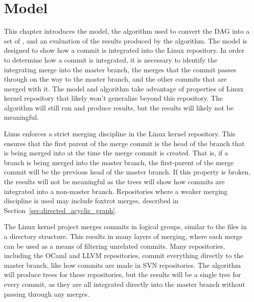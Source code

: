 \chapter{\mt{} Model}\label{chap:model}

This chapter introduces the \mt{} model, the algorithm used to
convert the DAG into a set of , and an evaluation of the results
produced by the algorithm.
The model is designed to show how a commit is integrated into the Linux
repository.
In order to determine how a commit is integrated, it is necessary to
identify the integrating merge into the master branch, the merges that
the commit passes through on the way to the master branch, and the other
commits that are merged with it.
The model and algorithm take advantage of properties of Linux kernel
repository that likely won't generalize beyond this repository.
The algorithm will still run and produce results, but the results will
likely not be meaningful.

Linus enforces a strict merging discipline in the Linux kernel
repository. This ensures that the first parent of the merge commit is
the head of the branch that is being merged into at the time the merge
commit is created.
That is, if a branch is being merged into the master branch, the
first-parent of the merge commit will be the previous head of the master
branch.
If this property is broken, the results will not be meaningful as the
trees will show how commits are integrated into a non-master branch.
Repositories where a weaker merging discipline is used may include
foxtrot merges, described in Section~\ref{sec:directed_acyclic_graph}.

The Linux kernel project merges commits in logical groups, similar to
the files in a directory structure.
This results in many layers of merging, where each merge can be used as
a means of filtering unrelated commits.
Many repositories, including the OCaml and LLVM repositories, commit
everything directly to the master branch, like how commits are made in
SVN repositories.
The algorithm will produce trees for these repositories, but the results
will be a single tree for every commit, as they are all integrated
directly into the master branch without passing through any merges.

